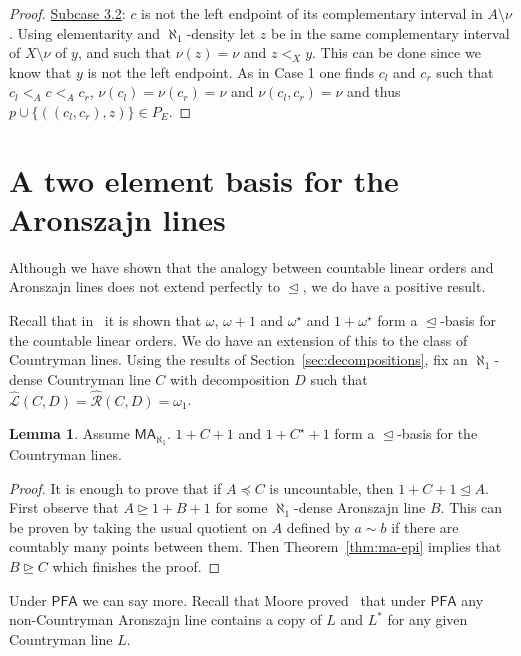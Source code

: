 \documentclass[10pt]{amsart}
\theoremstyle{definition}
\newtheorem{lemma}[theorem]{Lemma}
\theoremstyle{remark}
\newcommand{\setm}{\setminus}
\newcommand{\axiom}[1]{\mathsf{#1}}
\newcommand{\MA}{\axiom{MA}}
\newcommand{\PFA}{\axiom{PFA}}
\newcommand{\eleq}{\preceq}
\newcommand{\sleq}{\trianglelefteq}
\newcommand{\sgeq}{\trianglerighteq}
\renewcommand{\L}{\mathscr{L}}
\newcommand{\R}{\mathscr{R}}
\newcommand{\La}{\hat{\L}}
\newcommand{\Ra}{\hat{\R}}
\newcommand{\1}{\mathbbm{1}}
\begin{document}
\begin{proof}
  \underline{Subcase 3.2}: $c$ is not the left endpoint of its complementary interval in $A \setm \nu$.
  Using elementarity and $\aleph_{1}$-density let $z$ be in the same complementary
  interval of $X\setm \nu$ of $y$, and such that $\nu(z) = \nu$ and $z <_{X} y$.
  This can be done since we know that $y$ is not the left endpoint. As in Case
  1 one finds $c_{l}$ and $c_{r}$ such that $c_{l} <_{A} c <_{A} c_{r}$,
  $\nu(c_{l}) = \nu(c_{r}) = \nu$ and $\nu(c_{l},c_{r}) = \nu$ and thus
  $p \cup \{((c_{l},c_{r}),z)\} \in P_{E}$.
\end{proof}

\section{A two element basis for the Aronszajn lines}\label{sec:basis}

Although we have shown that the analogy between countable linear orders
and Aronszajn lines does not extend perfectly to $\sleq$, we do have a positive
result.

Recall that in~\cite{CamerloEtAl2015} it is shown that $\omega$, $\omega + 1$ and
$\omega^{\star}$ and $1 + \omega^{\star}$ form a $\sleq$-basis for the countable
linear orders. We do have an extension of this to the class of Countryman lines.
Using the results of Section~\ref{sec:decompositions}, fix an $\aleph_{1}$-dense
Countryman line $C$ with decomposition $D$
such that $\La(C,D) = \Ra(C,D) = \omega_{1}$.

\begin{lemma}\label{lem:countryman_basis}
  Assume $\MA_{\aleph_{1}}$.
  $1 + C + 1$ and $1 + C^{\star} + 1$ form a $\sleq$-basis for the Countryman lines.
\end{lemma}
\begin{proof}
  It is enough to prove that if $A \eleq C$ is uncountable, then $1 + C + 1 \sleq A$.
  First observe that $A \sgeq 1 + B + 1$ for some $\aleph_{1}$-dense
  Aronszajn line $B$. This can be proven by taking the usual
  quotient on $A$ defined by $a \sim b$ if there are countably many points between
  them. Then Theorem~\ref{thm:ma-epi} implies that $B \sgeq C$ which finishes the proof.
\end{proof}

Under $\PFA$ we can say more. Recall that Moore
proved~\cite[Theorem~1.3]{Moore2009} that under $\PFA$
any non-Countryman Aronszajn line contains a copy of $L$ and
$L^{*}$ for any given Countryman line $L$.
\end{document}
